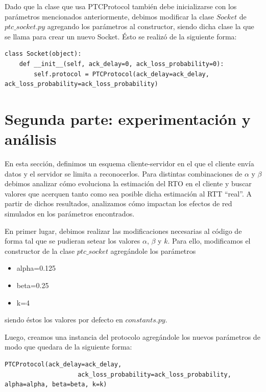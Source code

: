 \documentclass[10pt, a4paper]{article}
\begin{document}
Dado que la clase que usa PTCProtocol también debe inicializarse con los parámetros mencionados anteriormente, debimos modificar la clase $Socket$ de $ptc\_socket.py$ agregando los parámetros al constructor, siendo dicha clase la que se llama para crear un nuevo Socket. Ésto se realizó de la siguiente forma:
\begin{verbatim}
class Socket(object):
    def __init__(self, ack_delay=0, ack_loss_probability=0):
		self.protocol = PTCProtocol(ack_delay=ack_delay, ack_loss_probability=ack_loss_probability)
\end{verbatim}


\section{Segunda parte: experimentación y análisis}

En esta sección, definimos un esquema cliente-servidor en el que el cliente envía datos y el servidor se limita a reconocerlos. Para distintas combinaciones de $\alpha$ y $\beta$ debimos analizar cómo evoluciona la estimación del RTO en el cliente y buscar valores que acerquen tanto como sea posible dicha estimación al RTT ``real''. A partir de dichos resultados, analizamos cómo impactan los efectos de red simulados en los parámetros encontrados.


En primer lugar, debimos realizar las modificaciones necesarias al código de forma tal que se pudieran setear los valores $\alpha$, $\beta$ y $k$. 
Para ello, modificamos el constructor de la clase $ptc\_socket$ agregándole los parámetros 
\begin{itemize}
\item alpha=0.125
\item beta=0.25
\item k=4
\end{itemize}
siendo éstos los valores por defecto en $constants.py$.

Luego, creamos una instancia del protocolo agregándole los nuevos parámetros de modo que quedara de la siguiente forma:
\begin{verbatim}
PTCProtocol(ack_delay=ack_delay, 
					ack_loss_probability=ack_loss_probability, alpha=alpha, beta=beta, k=k)
\end{verbatim}
\end{document}
